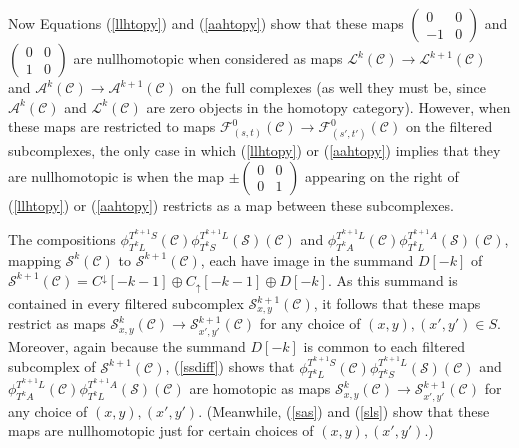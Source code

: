 \documentclass[11pt]{amsart}
\theoremstyle{definition}
\theoremstyle{remark}
\numberwithin{equation}{section}
\begin{document}
Now Equations (\ref{llhtopy}) and (\ref{aahtopy}) show that these maps $\left(\begin{array}{cc} 0 & 0 \\ -1 & 0\end{array}\right)$ and $\left(\begin{array}{cc} 0 & 0 \\ 1 & 0\end{array}\right)$ are nullhomotopic when considered as maps $\mathcal{L}^k(\mathcal{C})\to \mathcal{L}^{k+1}(\mathcal{C})$ and $\mathcal{A}^k(\mathcal{C})\to \mathcal{A}^{k+1}(\mathcal{C})$ on the full complexes (as well they must be, since $\mathcal{A}^k(\mathcal{C})$ and $\mathcal{L}^k(\mathcal{C})$ are zero objects in the homotopy category).  However, when these maps are restricted to maps $\mathcal{F}_{(s,t)}^{0}(\mathcal{C})\to \mathcal{F}_{(s',t')}^{0}(\mathcal{C})$ on the filtered subcomplexes, the only case in which (\ref{llhtopy}) or (\ref{aahtopy}) implies that they are nullhomotopic is when the map $\pm\left(\begin{array}{cc} 0 & 0 \\ 0 & 1\end{array}\right)$ appearing on the right of (\ref{llhtopy}) or (\ref{aahtopy}) restricts as a map between these subcomplexes.  

The compositions $\phi_{T^kL}^{T^{k+1}S}(\mathcal{C})\phi_{T^kS}^{T^{k+1}L}(\mathcal{S})(\mathcal{C})$ and $\phi_{T^kA}^{T^{k+1}L}(\mathcal{C})\phi_{T^kL}^{T^{k+1}A}(\mathcal{S})(\mathcal{C})$, mapping $\mathcal{S}^k(\mathcal{C})$ to $\mathcal{S}^{k+1}(\mathcal{C})$, each have image in the summand $D[-k]$ of $\mathcal{S}^{k+1}(\mathcal{C})=C^{\downarrow}[-k-1]\oplus C_{\uparrow}[-k-1]\oplus D[-k]$.  As this summand is contained in every filtered subcomplex $\mathcal{S}^{k+1}_{x,y}(\mathcal{C})$, it follows that these maps restrict as maps $\mathcal{S}^k_{x,y}(\mathcal{C})\to\mathcal{S}^{k+1}_{x',y'}(\mathcal{C})$ for any choice of $(x,y),(x',y')\in S$.  Moreover, again because the summand $D[-k]$ is common to each filtered subcomplex of $\mathcal{S}^{k+1}(\mathcal{C})$, (\ref{ssdiff}) shows that $\phi_{T^kL}^{T^{k+1}S}(\mathcal{C})\phi_{T^kS}^{T^{k+1}L}(\mathcal{S})(\mathcal{C})$ and $\phi_{T^kA}^{T^{k+1}L}(\mathcal{C})\phi_{T^kL}^{T^{k+1}A}(\mathcal{S})(\mathcal{C})$ are homotopic as maps $\mathcal{S}^k_{x,y}(\mathcal{C})\to\mathcal{S}^{k+1}_{x',y'}(\mathcal{C})$ for any choice of $(x,y),(x',y')$.  (Meanwhile, (\ref{sas}) and (\ref{sls}) show that these maps are nullhomotopic just for certain choices of $(x,y),(x',y')$.)
\end{document}
